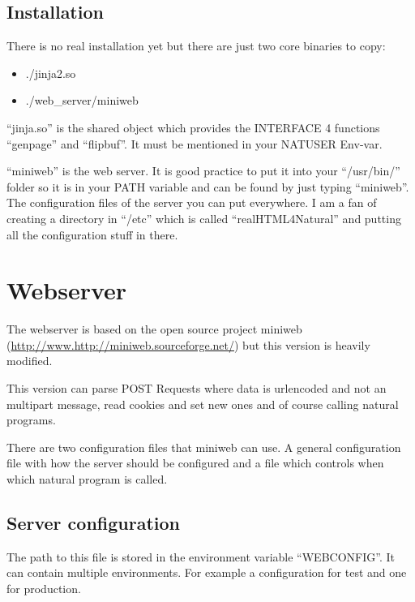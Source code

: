 \documentclass[letterpaper,10pt,english]{sphinxmanual}
\begin{document}
\subsection{Installation}
\label{installation:installation}
There is no real installation yet but there are just two core binaries to copy:
\begin{itemize}
\item {} 
./jinja2.so

\item {} 
./web\_server/miniweb

\end{itemize}

``jinja.so'' is the shared object which provides the INTERFACE 4 functions ``genpage'' and ``flipbuf''. It must be mentioned in your NATUSER Env-var.

``miniweb'' is the web server. It is good practice to put it into your ``/usr/bin/'' folder so it is in your PATH variable and can be found by just typing ``miniweb''. The configuration files of the server you can put everywhere.
I am a fan of creating a directory in ``/etc'' which is called ``realHTML4Natural'' and putting all the configuration stuff in there.


\section{Webserver}
\label{webserver:webserver}\label{webserver::doc}
The webserver is based on the open source project miniweb (\url{http://www.http://miniweb.sourceforge.net/}) but this version is heavily modified.

This version can parse POST Requests where data is urlencoded and not an multipart message, read cookies and set new ones and of course calling natural programs.

There are two configuration files that miniweb can use. A general configuration file with how the server should be configured and a file which controls when which natural program is called.


\subsection{Server configuration}
\label{webserver:server-configuration}\label{webserver:webserver-config}
The path to this file is stored in the environment variable ``WEBCONFIG''. It can contain multiple environments. For example a configuration for test and one for production.
\end{document}
